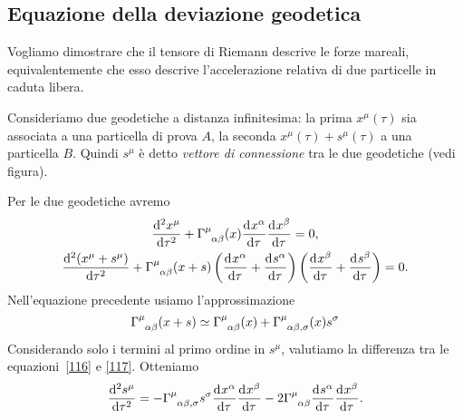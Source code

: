 \subsection{Equazione della deviazione geodetica}
\label{sec:deviazione-geodetica}

Vogliamo dimostrare che il tensore di Riemann descrive le forze mareali,
equivalentemente che esso descrive l'accelerazione relativa di due particelle in
caduta libera.

Consideriamo due geodetiche a distanza infinitesima: la prima $x^{\mu}(\tau)$
sia associata a una particella di prova $A$, la seconda $x^{\mu}(\tau)
+s^{\mu}(\tau)$ a una particella $B$.  Quindi $s^{\mu}$ è detto \emph{vettore di
  connessione} tra le due geodetiche (vedi figura).

Per le due geodetiche avremo
\begin{subequations}
  \begin{gather}
    \toder[2]{x^{\mu}}{\tau} + \tensor{\Gamma}{^{\mu}_{\alpha \beta}}(x)
    \toder{x^{\alpha}}{\tau} \toder{x^{\beta}}{\tau} = 0,
    \label{116} \\
    \toder[2]{(x^{\mu}+ s^{\mu})}{\tau} + \tensor{\Gamma}{^{\mu}_{\alpha
        \beta}}(x+s) \left(\toder{x^{\alpha}}{\tau} + \toder{s^{\alpha}}{\tau}
    \right) \left( \toder{x^{\beta}}{\tau} + \toder{s^{\beta}}{\tau} \right) =
    0.
    \label{117}
  \end{gather}
\end{subequations}
Nell'equazione precedente usiamo l'approssimazione
\begin{equation}
  \tensor{\Gamma}{^{\mu}_{\alpha \beta}}(x+s) \simeq
  \tensor{\Gamma}{^{\mu}_{\alpha \beta}}(x) + \tensor{\Gamma}{^{\mu}_{\alpha
      \beta ,\sigma}}(x) s^{\sigma}
\end{equation}
Considerando solo i termini al primo ordine in $s^{\mu}$, valutiamo la
differenza tra le equazioni~\eqref{116} e \eqref{117}.  Otteniamo
\begin{equation}
  \toder[2]{s^{\mu}}{\tau} =
  -\tensor{\Gamma}{^{\mu}_{\alpha \beta, \sigma}} s^{\sigma}
  \toder{x^{\alpha}}{\tau} \toder{x^{\beta}}{\tau}
  -2\tensor{\Gamma}{^{\mu}_{\alpha \beta}} \toder{s^{\alpha}}{\tau}
  \toder{x^{\beta}}{\tau}.
  \label{119}
\end{equation}

